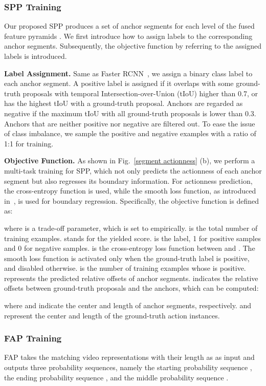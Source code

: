 \documentclass[10pt,twocolumn,letterpaper]{article}
\begin{document}
\subsubsection{SPP Training}
 Our proposed SPP produces a set of anchor segments  for each level  of the fused feature pyramids . We  first introduce how to assign labels to the corresponding anchor segments. Subsequently, the objective function by referring to the assigned labels is introduced.

\textbf{Label Assignment.} 
{Same as Faster RCNN~\cite{faster_rcnn}, we assign a binary class label to each anchor segment. A positive label is assigned if it overlaps with some ground-truth proposals with temporal Intersection-over-Union (tIoU) higher than 0.7, or has the highest tIoU with a ground-truth proposal. Anchors are regarded as negative if the maximum tIoU with all ground-truth proposals is lower than 0.3. Anchors that are neither positive nor negative are filtered out. To ease the issue of class imbalance, we sample the positive and negative examples with a ratio of 1:1 for training.}


\textbf{Objective Function.} As shown in  Fig.~\ref{segment actionness} (b), we perform a multi-task training for SPP, which not only predicts the actionness of each anchor segment but also regresses its boundary information. For actionness prediction, the cross-entropy function is used, while the smooth  loss function, as introduced in~\cite{fast_rcnn}, is used for boundary regression. Specifically, the objective function is defined as:

where  is a trade-off parameter, which is set to  empirically.  is the total number of training examples.  stands for the yielded score.  is the label, 1 for positive samples and 0 for negative samples.  is the cross-entropy loss function between  and . The smooth  loss function  is activated only when the ground-truth label  is positive, and disabled otherwise.  is the number of training examples whose  is positive.  represents the predicted relative offsets of anchor segments.  indicates the relative offsets between ground-truth proposals and the anchors, which can be computed: 

where  and  indicate the center and  length of anchor segments, respectively.  and  represent the center and length  of the ground-truth action instances.


\subsubsection{ FAP Training}
FAP takes the matching video representations with their length as   as input and outputs three probability sequences, namely the starting probability sequence 
,  the ending probability sequence
, and the middle probability sequence
 .
\end{document}
